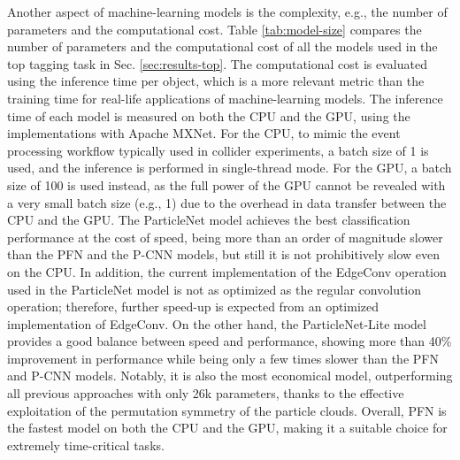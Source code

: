 \documentclass[aps,prd,longbibliography,reprint,amsmath,amssymb,amsfonts]{revtex4-1}
\begin{document}
Another aspect of machine-learning models is the complexity, e.g., the number of parameters and the computational cost. Table \ref{tab:model-size} compares the number of parameters and the computational cost of all the models used in the top tagging task in Sec. \ref{sec:results-top}. The computational cost is evaluated using the inference time per object, which is a more relevant metric than the training time for real-life applications of machine-learning models. The inference time of each model is measured on both the CPU and the GPU, using the implementations with Apache MXNet. For the CPU, to mimic the  event processing workflow typically used in collider experiments, a batch size of 1 is used, and the inference is performed in single-thread mode. For the GPU, a batch size of 100 is used instead, as the full power of the GPU cannot be revealed with a very small batch size (e.g., 1) due to the overhead in data transfer between the CPU and the GPU. The ParticleNet model achieves the best classification performance at the cost of speed, being more than an order of magnitude slower than the PFN and the P-CNN models, but still it is not prohibitively slow even on the CPU. In addition, the current implementation of the EdgeConv operation used in the ParticleNet model is not as optimized as the regular convolution operation; therefore, further speed-up is expected from an optimized implementation of EdgeConv. On the other hand, the ParticleNet-Lite model provides a good balance between speed and performance, showing more than 40\% improvement in performance while being only a few times slower than the PFN and P-CNN models. Notably, it is also the most economical model, outperforming all previous approaches with only 26k parameters, thanks to the effective exploitation of the permutation symmetry of the particle clouds. Overall, PFN is the fastest model on both the CPU and the GPU, making it a suitable choice for extremely time-critical tasks.
\end{document}
